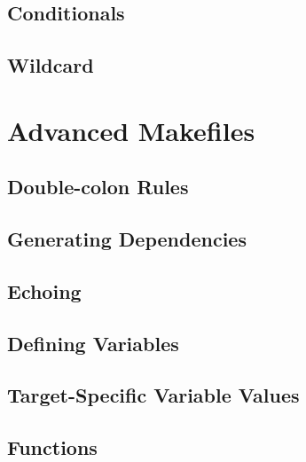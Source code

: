 \documentclass[8pt]{beamer}
\begin{document}
\subsection{Conditionals}


\subsection{Wildcard}


%
%

\section{Advanced Makefiles}

\subsection{Double-colon Rules}


\subsection{Generating Dependencies}


\subsection{Echoing}


\subsection{Defining Variables}


\subsection{Target-Specific Variable Values}


\subsection{Functions}
\end{document}
